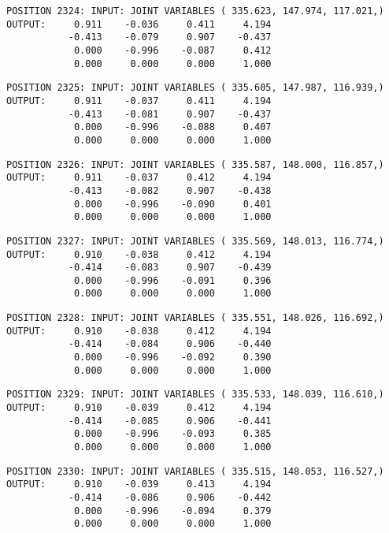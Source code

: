 \begin{verbatim}
POSITION 2324: INPUT: JOINT VARIABLES ( 335.623, 147.974, 117.021,)
OUTPUT:     0.911    -0.036     0.411     4.194
           -0.413    -0.079     0.907    -0.437
            0.000    -0.996    -0.087     0.412
            0.000     0.000     0.000     1.000
\end{verbatim} \pagebreak[1]\begin{verbatim}
POSITION 2325: INPUT: JOINT VARIABLES ( 335.605, 147.987, 116.939,)
OUTPUT:     0.911    -0.037     0.411     4.194
           -0.413    -0.081     0.907    -0.437
            0.000    -0.996    -0.088     0.407
            0.000     0.000     0.000     1.000
\end{verbatim} \pagebreak[1]\begin{verbatim}
POSITION 2326: INPUT: JOINT VARIABLES ( 335.587, 148.000, 116.857,)
OUTPUT:     0.911    -0.037     0.412     4.194
           -0.413    -0.082     0.907    -0.438
            0.000    -0.996    -0.090     0.401
            0.000     0.000     0.000     1.000
\end{verbatim} \pagebreak[1]\begin{verbatim}
POSITION 2327: INPUT: JOINT VARIABLES ( 335.569, 148.013, 116.774,)
OUTPUT:     0.910    -0.038     0.412     4.194
           -0.414    -0.083     0.907    -0.439
            0.000    -0.996    -0.091     0.396
            0.000     0.000     0.000     1.000
\end{verbatim} \pagebreak[1]\begin{verbatim}
POSITION 2328: INPUT: JOINT VARIABLES ( 335.551, 148.026, 116.692,)
OUTPUT:     0.910    -0.038     0.412     4.194
           -0.414    -0.084     0.906    -0.440
            0.000    -0.996    -0.092     0.390
            0.000     0.000     0.000     1.000
\end{verbatim} \pagebreak[1]\begin{verbatim}
POSITION 2329: INPUT: JOINT VARIABLES ( 335.533, 148.039, 116.610,)
OUTPUT:     0.910    -0.039     0.412     4.194
           -0.414    -0.085     0.906    -0.441
            0.000    -0.996    -0.093     0.385
            0.000     0.000     0.000     1.000
\end{verbatim} \pagebreak[1]\begin{verbatim}
POSITION 2330: INPUT: JOINT VARIABLES ( 335.515, 148.053, 116.527,)
OUTPUT:     0.910    -0.039     0.413     4.194
           -0.414    -0.086     0.906    -0.442
            0.000    -0.996    -0.094     0.379
            0.000     0.000     0.000     1.000
\end{verbatim} \pagebreak[1]\begin{verbatim}

\end{verbatim}
